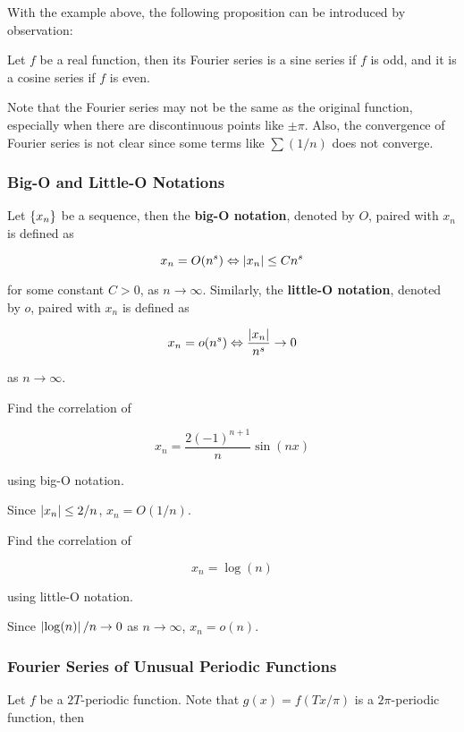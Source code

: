 \documentclass[a4paper,12pt]{article}
\begin{document}
With the example above, the following proposition can be introduced by observation:\n

\begin{pst}
  Let $f$ be a real function, then its Fourier series is a sine series if $f$ is odd, and it is a cosine series if $f$ is even.
\end{pst}\n

Note that the Fourier series may not be the same as the original function, especially when there are discontinuous points like $\pm\pi$. Also, the convergence of Fourier series is not clear since some terms like $\sum(1/n)$ does not converge. 

\subsubsection{Big-O and Little-O Notations}
\begin{dft}
  Let $\left\{ x_{n}\right\}$ be a sequence, then the \textbf{big-O notation}, denoted by $O$, paired with $x_{n}$ is defined as

  $$x_{n}=O(n^{s})\Leftrightarrow\left| x_{n}\right|\leq Cn^{s}$$\s

  for some constant $C>0$, as $n\to\infty$. Similarly, the \textbf{little-O notation}, denoted by $o$, paired with $x_{n}$ is defined as

  $$x_{n}=o(n^{s})\Leftrightarrow\frac{\left| x_{n}\right|}{n^{s}}\to 0$$\s

  as $n\to\infty$.
\end{dft}\n

\begin{exm}
  Find the correlation of
  
  $$x_{n}=\frac{2(-1)^{n+1}}{n}\sin(nx)$$\s

  using big-O notation.\n

  \ans Since $\left| x_{n}\right|\leq 2/n$, $x_{n}=O(1/n)$.
\end{exm}\n

\begin{exm}
  Find the correlation of

  $$x_{n}=\log(n)$$\s

  using little-O notation.\n

  \ans Since $\left| \log(n)\right|/n\to 0$ as $n\to\infty$, $x_{n}=o(n)$.
\end{exm}

\subsubsection{Fourier Series of Unusual Periodic Functions}
Let $f$ be a $2T$-periodic function. Note that $g(x)=f(Tx/\pi)$ is a $2\pi$-periodic function, then
\end{document}
